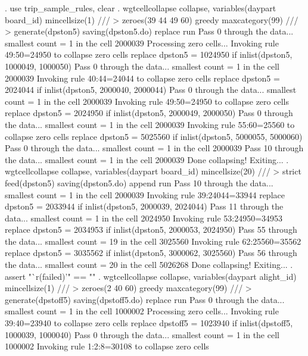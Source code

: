 . use trip_sample_rules, clear
{\smallskip}
. wgtcellcollapse collapse, variables(daypart board_id) mincellsize(1) ///
>         zeroes(39 44 49 60) greedy maxcategory(99) ///
>         generate(dpston5) saving(dpston5.do) replace run
Pass 0 through the data...
  smallest count = 1 in the cell      2000039
{\smallskip}
Processing zero cells...
{\smallskip}
  Invoking rule 49:50=24950 to collapse zero cells
  replace dpston5 = 1024950 if inlist(dpston5, 1000049, 1000050)
Pass 0 through the data...
  smallest count = 1 in the cell      2000039
  Invoking rule 40:44=24044 to collapse zero cells
  replace dpston5 = 2024044 if inlist(dpston5, 2000040, 2000044)
Pass 0 through the data...
  smallest count = 1 in the cell      2000039
  Invoking rule 49:50=24950 to collapse zero cells
  replace dpston5 = 2024950 if inlist(dpston5, 2000049, 2000050)
\smallskip
\oom
\smallskip
Pass 0 through the data...
  smallest count = 1 in the cell      2000039
  Invoking rule 55:60=25560 to collapse zero cells
  replace dpston5 = 5025560 if inlist(dpston5, 5000055, 5000060)
Pass 0 through the data...
  smallest count = 1 in the cell      2000039
Pass 10 through the data...
  smallest count = 1 in the cell      2000039
  Done collapsing! Exiting...
{\smallskip}
. wgtcellcollapse collapse, variables(daypart board_id) mincellsize(20) ///
>         strict feed(dpston5) saving(dpston5.do) append run
Pass 10 through the data...
  smallest count = 1 in the cell      2000039
  Invoking rule 39:24044=33944
  replace dpston5 = 2033944 if inlist(dpston5, 2000039, 2024044)
Pass 11 through the data...
  smallest count = 1 in the cell      2024950
  Invoking rule 53:24950=34953
  replace dpston5 = 2034953 if inlist(dpston5, 2000053, 2024950)
\smallskip
\oom
\smallskip
Pass 55 through the data...
  smallest count = 19 in the cell      3025560
  Invoking rule 62:25560=35562
  replace dpston5 = 3035562 if inlist(dpston5, 3000062, 3025560)
Pass 56 through the data...
  smallest count = 20 in the cell      5026268
  Done collapsing! Exiting...
{\smallskip}
. assert "`r(failed)'" == ""
{\smallskip}
. wgtcellcollapse collapse, variables(daypart alight_id) mincellsize(1) ///
>         zeroes(2 40 60) greedy maxcategory(99) ///
>         generate(dpstoff5) saving(dpstoff5.do) replace run
Pass 0 through the data...
  smallest count = 1 in the cell      1000002
{\smallskip}
Processing zero cells...
{\smallskip}
  Invoking rule 39:40=23940 to collapse zero cells
  replace dpstoff5 = 1023940 if inlist(dpstoff5, 1000039, 1000040)
Pass 0 through the data...
  smallest count = 1 in the cell      1000002
  Invoking rule 1:2:8=30108 to collapse zero cells
